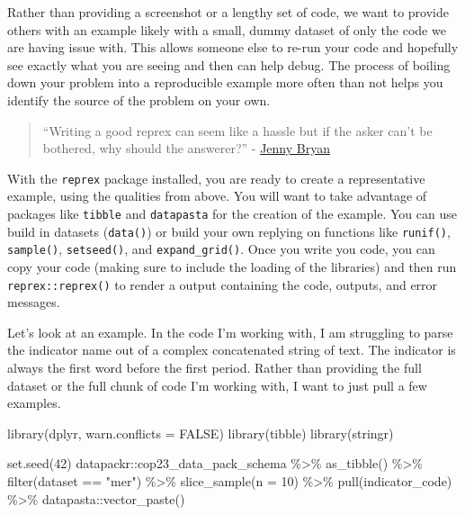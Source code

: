 \documentclass[
  letterpaper,
  DIV=11,
  numbers=noendperiod]{scrreprt}
\newenvironment{Shaded}{\begin{snugshade}}{\end{snugshade}}
\newcommand{\AttributeTok}[1]{\textcolor[rgb]{0.40,0.45,0.13}{#1}}
\newcommand{\ConstantTok}[1]{\textcolor[rgb]{0.56,0.35,0.01}{#1}}
\newcommand{\DecValTok}[1]{\textcolor[rgb]{0.68,0.00,0.00}{#1}}
\newcommand{\FunctionTok}[1]{\textcolor[rgb]{0.28,0.35,0.67}{#1}}
\newcommand{\NormalTok}[1]{\textcolor[rgb]{0.00,0.23,0.31}{#1}}
\newcommand{\SpecialCharTok}[1]{\textcolor[rgb]{0.37,0.37,0.37}{#1}}
\newcommand{\StringTok}[1]{\textcolor[rgb]{0.13,0.47,0.30}{#1}}
\begin{document}
Rather than providing a screenshot or a lengthy set of code, we want to
provide others with an example likely with a small, dummy dataset of
only the code we are having issue with. This allows someone else to
re-run your code and hopefully see exactly what you are seeing and then
can help debug. The process of boiling down your problem into a
reproducible example more often than not helps you identify the source
of the problem on your own.

\begin{quote}
``Writing a good reprex can seem like a hassle but if the asker can't be
bothered, why should the answerer?'' -
\href{https://speakerdeck.com/jennybc/reprex-help-me-help-you?slide=21}{Jenny
Bryan}
\end{quote}

With the \texttt{reprex} package installed, you are ready to create a
representative example, using the qualities from above. You will want to
take advantage of packages like \texttt{tibble} and \texttt{datapasta}
for the creation of the example. You can use build in datasets
(\texttt{data()}) or build your own replying on functions like
\texttt{runif()}, \texttt{sample()}, \texttt{setseed()}, and
\texttt{expand\_grid()}. Once you write you code, you can copy your code
(making sure to include the loading of the libraries) and then run
\texttt{reprex::reprex()} to render a output containing the code,
outputs, and error messages.

Let's look at an example. In the code I'm working with, I am struggling
to parse the indicator name out of a complex concatenated string of
text. The indicator is always the first word before the first period.
Rather than providing the full dataset or the full chunk of code I'm
working with, I want to just pull a few examples.

\begin{Shaded}
\begin{Highlighting}[]
\FunctionTok{library}\NormalTok{(dplyr, }\AttributeTok{warn.conflicts =} \ConstantTok{FALSE}\NormalTok{)}
\FunctionTok{library}\NormalTok{(tibble)}
\FunctionTok{library}\NormalTok{(stringr)}

\FunctionTok{set.seed}\NormalTok{(}\DecValTok{42}\NormalTok{)}
\NormalTok{datapackr}\SpecialCharTok{::}\NormalTok{cop23\_data\_pack\_schema }\SpecialCharTok{\%\textgreater{}\%}
  \FunctionTok{as\_tibble}\NormalTok{() }\SpecialCharTok{\%\textgreater{}\%}
  \FunctionTok{filter}\NormalTok{(dataset }\SpecialCharTok{==} \StringTok{"mer"}\NormalTok{) }\SpecialCharTok{\%\textgreater{}\%}
  \FunctionTok{slice\_sample}\NormalTok{(}\AttributeTok{n =} \DecValTok{10}\NormalTok{) }\SpecialCharTok{\%\textgreater{}\%}
  \FunctionTok{pull}\NormalTok{(indicator\_code) }\SpecialCharTok{\%\textgreater{}\%}
\NormalTok{  datapasta}\SpecialCharTok{::}\FunctionTok{vector\_paste}\NormalTok{()}
\end{Highlighting}
\end{Shaded}
\end{document}
